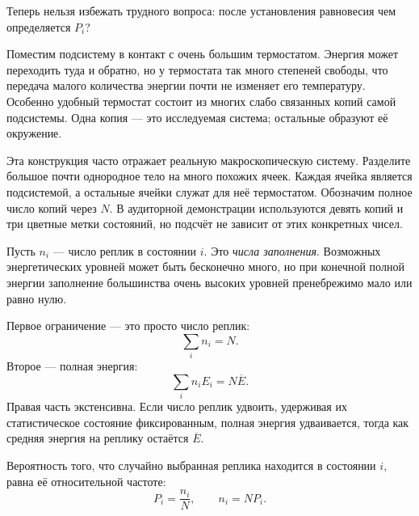 Теперь нельзя избежать трудного вопроса: после установления равновесия чем определяется \(P_i\)?

Поместим подсистему в контакт с очень большим термостатом. Энергия может переходить туда и обратно, но у термостата так много степеней свободы, что передача малого количества энергии почти не изменяет его температуру. Особенно удобный термостат состоит из многих слабо связанных копий самой подсистемы. Одна копия — это исследуемая система; остальные образуют её окружение.

Эта конструкция часто отражает реальную макроскопическую систему. Разделите большое почти однородное тело на много похожих ячеек. Каждая ячейка является подсистемой, а остальные ячейки служат для неё термостатом. Обозначим полное число копий через \(N\). В аудиторной демонстрации используются девять копий и три цветные метки состояний, но подсчёт не зависит от этих конкретных чисел.

Пусть \(n_i\) — число реплик в состоянии \(i\). Это \emph{числа заполнения}. Возможных энергетических уровней может быть бесконечно много, но при конечной полной энергии заполнение большинства очень высоких уровней пренебрежимо мало или равно нулю.

Первое ограничение — это просто число реплик:
\begin{equation}
 \sum_i n_i=N.
 \label{eq:sm3-number-constraint}
\end{equation}
Второе — полная энергия:
\begin{equation}
 \sum_i n_iE_i=N\overline E.
 \label{eq:sm3-total-energy-constraint}
\end{equation}
Правая часть экстенсивна. Если число реплик удвоить, удерживая их статистическое состояние фиксированным, полная энергия удваивается, тогда как средняя энергия на реплику остаётся \(\overline E\).

\begin{classroomqa}
\end{classroomqa}

Вероятность того, что случайно выбранная реплика находится в состоянии \(i\), равна её относительной частоте:
\begin{equation}
 P_i=\frac{n_i}{N},
 \qquad
 n_i=NP_i.
 \label{eq:sm3-frequency-probability}
\end{equation}

